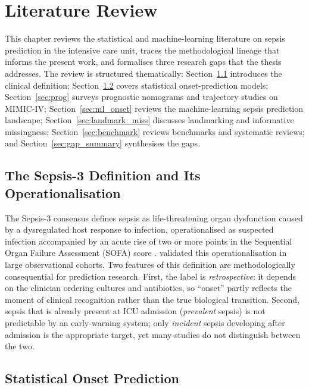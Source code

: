 \chapter{Literature Review}
\label{ch:review}

This chapter reviews the statistical and machine-learning literature on sepsis
prediction in the intensive care unit, traces the methodological lineage that
informs the present work, and formalises three research gaps that the thesis
addresses. The review is structured thematically: Section~\ref{sec:sepsis_def}
introduces the clinical definition; Section~\ref{sec:stat_onset} covers
statistical onset-prediction models; Section~\ref{sec:prog} surveys prognostic
nomograms and trajectory studies on MIMIC-IV;
Section~\ref{sec:ml_onset} reviews the machine-learning sepsis prediction
landscape; Section~\ref{sec:landmark_miss} discusses landmarking and
informative missingness; Section~\ref{sec:benchmark} reviews benchmarks and
systematic reviews; and Section~\ref{sec:gap_summary} synthesises the gaps.

\section{The Sepsis-3 Definition and Its Operationalisation}
\label{sec:sepsis_def}

The Sepsis-3 consensus \cite{singer2016sepsis3} defines sepsis as
life-threatening organ dysfunction caused by a dysregulated host response to
infection, operationalised as suspected infection accompanied by an acute
rise of two or more points in the Sequential Organ Failure Assessment (SOFA)
score \cite{vincent1996sofa}. \textcite{seymour2016criteria} validated this
operationalisation in large observational cohorts. Two features of this definition are methodologically
consequential for prediction research. First, the label is \emph{retrospective}:
it depends on the clinician ordering cultures and antibiotics, so ``onset'' partly
reflects the moment of clinical recognition rather than the true biological
transition. Second, sepsis that is already present at ICU admission
(\emph{prevalent} sepsis) is not predictable by an early-warning system;
only \emph{incident} sepsis developing after admission is the
appropriate target, yet many studies do not distinguish between the two.

\section{Statistical Onset Prediction}
\label{sec:stat_onset}


